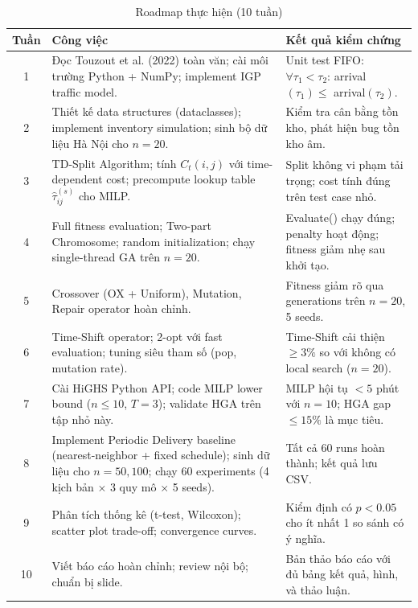 \documentclass[12pt,a4paper]{article}
\begin{document}
\begin{table}[htbp]
\centering
\caption{Roadmap thực hiện (10 tuần)}
\label{tab:roadmap}
\renewcommand{\arraystretch}{1.3}
\begin{tabularx}{\linewidth}{@{}c X X@{}}
\toprule
\textbf{Tuần} & \textbf{Công việc} & \textbf{Kết quả kiểm chứng} \\
\midrule
1 & Đọc Touzout et al. (2022) toàn văn; cài môi trường Python + NumPy;
    implement IGP traffic model. &
    Unit test FIFO: $\forall \tau_1 < \tau_2$: arrival$(\tau_1) \leq$ arrival$(\tau_2)$. \\
2 & Thiết kế data structures (dataclasses); implement inventory simulation;
    sinh bộ dữ liệu Hà Nội cho $n = 20$. &
    Kiểm tra cân bằng tồn kho, phát hiện bug tồn kho âm. \\
3 & TD-Split Algorithm; tính $C_t(i,j)$ với time-dependent cost;
    precompute lookup table $\hat{\tau}_{ij}^{(s)}$ cho MILP. &
    Split không vi phạm tải trọng; cost tính đúng trên test case nhỏ. \\
4 & Full fitness evaluation; Two-part Chromosome; random initialization;
    chạy single-thread GA trên $n=20$. &
    Evaluate() chạy đúng; penalty hoạt động; fitness giảm nhẹ sau khởi tạo. \\
5 & Crossover (OX + Uniform), Mutation, Repair operator hoàn chỉnh. &
    Fitness giảm rõ qua generations trên $n=20$, 5 seeds. \\
6 & Time-Shift operator; 2-opt với fast evaluation;
    tuning siêu tham số (pop, mutation rate). &
    Time-Shift cải thiện $\geq 3\%$ so với không có local search ($n=20$). \\
7 & Cài HiGHS Python API; code MILP lower bound ($n \leq 10$, $T=3$);
    validate HGA trên tập nhỏ này. &
    MILP hội tụ $< 5$ phút với $n=10$; HGA gap $\leq 15\%$ là mục tiêu. \\
8 & Implement Periodic Delivery baseline (nearest-neighbor + fixed schedule);
    sinh dữ liệu cho $n = 50, 100$; chạy 60 experiments
    (4 kịch bản $\times$ 3 quy mô $\times$ 5 seeds). &
    Tất cả 60 runs hoàn thành; kết quả lưu CSV. \\
9 & Phân tích thống kê (t-test, Wilcoxon); scatter plot trade-off;
    convergence curves. &
    Kiểm định có $p < 0.05$ cho ít nhất 1 so sánh có ý nghĩa. \\
10 & Viết báo cáo hoàn chỉnh; review nội bộ; chuẩn bị slide. &
    Bản thảo báo cáo với đủ bảng kết quả, hình, và thảo luận. \\
\bottomrule
\end{tabularx}
\end{table}
\end{document}
